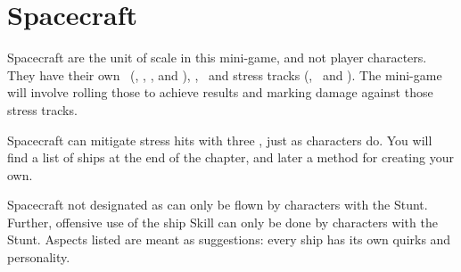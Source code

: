 \section{Spacecraft}
\label{sec:spacecraft}

Spacecraft are the unit of scale in this mini-game, and not player characters. They have their own \Skills\ (\Vshift, , , and ), \Stunts, \Aspects\ and stress tracks (\Frame, \Data\ and \Heat). The mini-game will involve rolling those \Skills to achieve results and marking damage against those stress tracks.

Spacecraft can mitigate stress hits with three \Consequences, just as characters do. You will find a list of ships at the end of the chapter, and later a method for creating your own.

Spacecraft not designated as  can only be flown by characters with the  Stunt. Further, offensive use of the  ship Skill can only be done by characters with the  Stunt. Aspects listed are meant as suggestions: every ship has its own quirks and personality.

